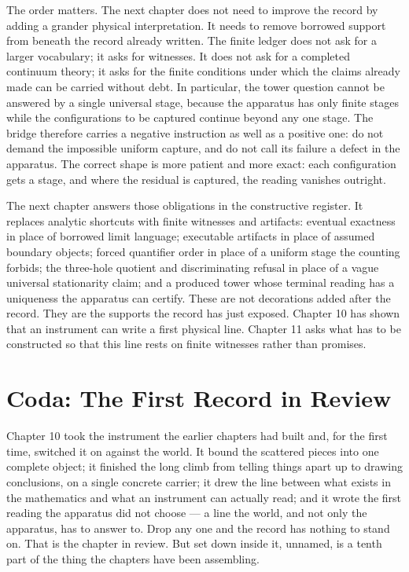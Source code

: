 The order matters. The next chapter does not need to improve the record by adding a
grander physical interpretation. It needs to remove borrowed support from beneath the
record already written. The finite ledger does not ask for a larger vocabulary; it
asks for witnesses. It does not ask for a completed continuum theory; it asks for the
finite conditions under which the claims already made can be carried without debt. In
particular, the tower question cannot be answered by a single universal stage, because
the apparatus has only finite stages while the configurations to be captured continue
beyond any one stage. The bridge therefore carries a negative instruction as well as a
positive one: do not demand the impossible uniform capture, and do not call its
failure a defect in the apparatus. The correct shape is more patient and more exact:
each configuration gets a stage, and where the residual is captured, the reading
vanishes outright.

The next chapter answers those obligations in the constructive register. It replaces
analytic shortcuts with finite witnesses and artifacts: eventual exactness in place of
borrowed limit language; executable artifacts in place of assumed boundary objects;
forced quantifier order in place of a uniform stage the counting forbids; the
three-hole quotient and discriminating refusal in place of a vague universal
stationarity claim; and a produced tower whose terminal reading has a uniqueness the
apparatus can certify. These are not decorations added after the record. They are the
supports the record has just exposed. Chapter 10 has shown that an instrument can
write a first physical line. Chapter 11 asks what has to be constructed so that this
line rests on finite witnesses rather than promises.

\section*{Coda: The First Record in Review}

Chapter 10 took the instrument the earlier chapters had built and, for the first time, switched it on against the world. It bound the scattered pieces into one complete object; it finished the long climb from telling things apart up to drawing conclusions, on a single concrete carrier; it drew the line between what exists in the mathematics and what an instrument can actually read; and it wrote the first reading the apparatus did not choose --- a line the world, and not only the apparatus, has to answer to. Drop any one and the record has nothing to stand on. That is the chapter in review. But set down inside it, unnamed, is a tenth part of the thing the chapters have been assembling.

